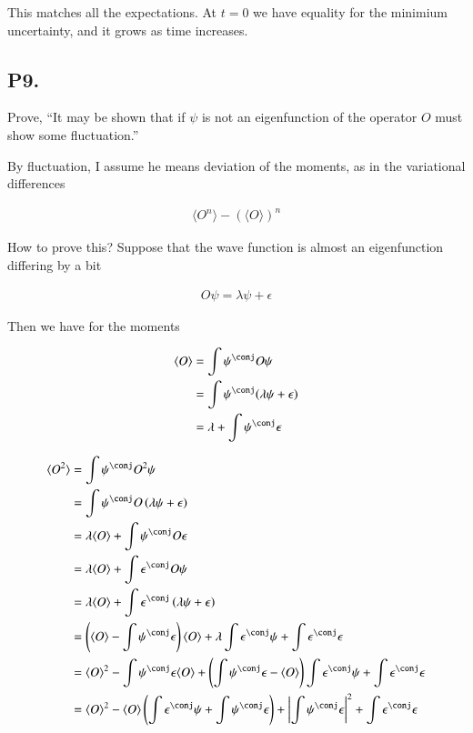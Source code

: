 \documentclass{article}
\newcommand{\expectation}[1]{\langle{#1}\rangle}
\begin{document}
This matches all the expectations.  At $t=0$ we have equality for the minimium uncertainty, and it grows as
time increases.

\subsection{ P9. }

Prove, ``It may be shown that if $\psi$ is not an eigenfunction of the operator $O$ must show some fluctuation.''

By fluctuation, I assume he means deviation of the moments, 
as in the variational differences

\begin{align*}
\expectation{O^n} - (\expectation{O})^n 
\end{align*}

How to prove this?  Suppose that the wave function is almost an eigenfunction
differing by a bit

\begin{align*}
O \psi = \lambda \psi + \epsilon
\end{align*}

Then we have for the moments

\begin{align*}
\expectation{O}
&= \int \psi^\conj O \psi \\
&= \int \psi^\conj ( \lambda \psi + \epsilon ) \\
&= \lambda + \int \psi^\conj \epsilon \\
\end{align*}

\begin{align*}
\expectation{O^2}
&= \int \psi^\conj O^2 \psi \\
&= \int \psi^\conj O \left( \lambda \psi + \epsilon \right) \\
&= \lambda \expectation{O} + \int \psi^\conj O \epsilon \\
&= \lambda \expectation{O} + \int \epsilon^\conj O \psi \\
&= \lambda \expectation{O} + \int \epsilon^\conj \left(\lambda \psi + \epsilon\right) \\
&= \left(\expectation{O} - \int \psi^\conj \epsilon \right)\expectation{O} + 
\lambda \int \epsilon^\conj \psi 
+ \int \epsilon^\conj \epsilon 
\\
&= \expectation{O}^2 - \int \psi^\conj \epsilon \expectation{O} + \left( \int \psi^\conj \epsilon - \expectation{O}\right) \int \epsilon^\conj \psi + \int \epsilon^\conj \epsilon 
\\
&= \expectation{O}^2 
- \expectation{O} \left( \int \epsilon^\conj \psi + \int \psi^\conj \epsilon \right)
+ \Abs{\int \psi^\conj \epsilon}^2
+ \int \epsilon^\conj \epsilon 
\\
\end{align*}
\end{document}
